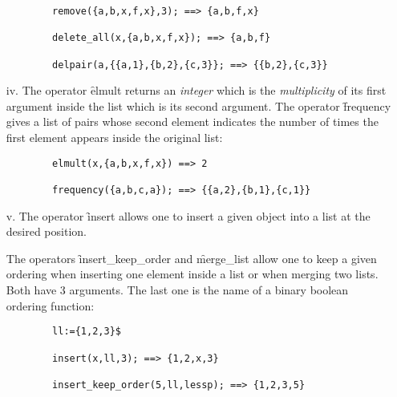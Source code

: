 \begin{itemize}
\begin{verbatim}
        remove({a,b,x,f,x},3); ==> {a,b,f,x}

        delete_all(x,{a,b,x,f,x}); ==> {a,b,f}

        delpair(a,{{a,1},{b,2},{c,3}}; ==> {{b,2},{c,3}}
\end{verbatim}
\item[iv.]
  \hypertarget{operator:ELMULT}{}
  \hypertarget{operator:FREQUENCY}{}
The operator \f{elmult} returns an \emph{integer} which is the
\emph{multiplicity} of its first argument inside the list which is its
second argument.
The operator \f{frequency} gives a list of pairs
whose second element indicates the number of times the first element
appears inside the original list:
\begin{verbatim}
        elmult(x,{a,b,x,f,x}) ==> 2

        frequency({a,b,c,a}); ==> {{a,2},{b,1},{c,1}}
\end{verbatim}
\item[v.]
  \hypertarget{operator:INSERT}{}
  \hypertarget{operator:INSERT_KEEP_ORDER}{}
  \hypertarget{operator:MERGE_LIST}{}
The operator \f{insert} allows one to insert a given object into a list
at the desired position.

The operators \f{insert\_keep\_order} and \f{merge\_list} allow one to
keep a given ordering when inserting one element inside a list or
when merging two lists. Both have 3 arguments. The last one  is
the name of a binary boolean ordering function:
\begin{verbatim}
        ll:={1,2,3}$

        insert(x,ll,3); ==> {1,2,x,3}

        insert_keep_order(5,ll,lessp); ==> {1,2,3,5}


\end{verbatim}
\end{itemize}
